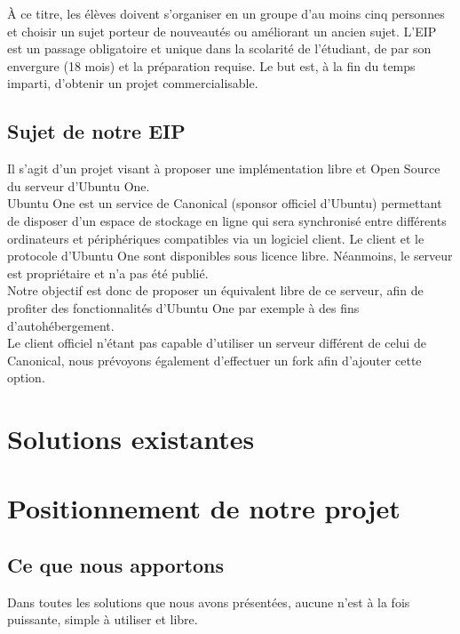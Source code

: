 \documentclass[12pt]{report}
\begin{document}
À ce titre, les élèves doivent s'organiser en un groupe d'au moins cinq personnes et choisir un sujet porteur de nouveautés ou améliorant un ancien sujet. L'EIP est un passage obligatoire et unique dans la scolarité de l'étudiant, de par son envergure (18 mois) et la préparation requise. Le but est, à la fin du temps imparti, d'obtenir un projet commercialisable.


\section{Sujet de notre EIP}
    Il s’agit d’un projet visant à proposer une implémentation libre et Open Source du serveur d’Ubuntu One.\\

    Ubuntu One est un service de Canonical (sponsor officiel d'Ubuntu) permettant de disposer d’un espace de stockage en ligne qui sera synchronisé entre différents ordinateurs et périphériques compatibles via un logiciel client. Le client et le protocole d’Ubuntu One sont disponibles sous licence libre. Néanmoins, le serveur est propriétaire et n’a pas été publié.\\


    Notre objectif est donc de proposer un équivalent libre de ce serveur, afin
    de profiter des fonctionnalités d’Ubuntu One par exemple à des fins d’autohébergement.\\

    Le client officiel n’étant pas capable d’utiliser un serveur différent de celui
    de Canonical, nous prévoyons également d'effectuer un fork afin d'ajouter cette option.

\thispagestyle{EIP} %

\chapter{Solutions existantes}










\chapter{Positionnement de notre projet}
\thispagestyle{EIP}
\section{Ce que nous apportons}
Dans toutes les solutions que nous avons présentées, aucune n'est à la fois puissante, simple à utiliser et libre.
\end{document}
